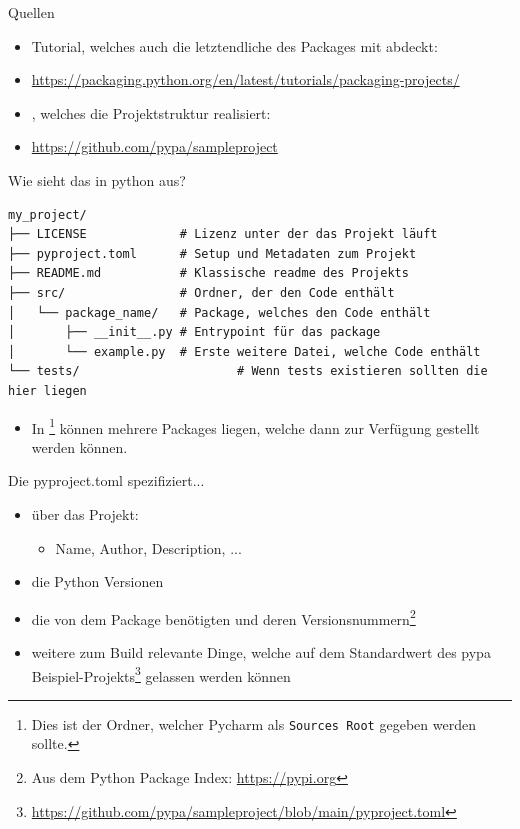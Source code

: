 \documentclass[12pt, aspectratio=169, usepdftitle=false]{beamer}
\newcommand{\furl}[1]{\footnote{\url{#1}}}
\begin{document}
\begin{frame}{Quellen}
	\begin{itemize}
		\item Tutorial, welches auch die letztendliche  des Packages mit abdeckt:
		\item[] \url{https://packaging.python.org/en/latest/tutorials/packaging-projects/}
		\item {}, welches die Projektstruktur realisiert:
		\item[] \url{https://github.com/pypa/sampleproject}
	\end{itemize}

\end{frame}


\begin{frame}[fragile]{Wie sieht das in python aus?}
\begin{verbatim}
my_project/
├── LICENSE             # Lizenz unter der das Projekt läuft
├── pyproject.toml      # Setup und Metadaten zum Projekt
├── README.md           # Klassische readme des Projekts
├── src/                # Ordner, der den Code enthält
│   └── package_name/   # Package, welches den Code enthält
│       ├── __init__.py # Entrypoint für das package
│       └── example.py  # Erste weitere Datei, welche Code enthält
└── tests/						# Wenn tests existieren sollten die hier liegen 
\end{verbatim}
	\begin{itemize}
		\item In \footnote{Dies ist der Ordner, welcher Pycharm als \texttt{Sources Root} gegeben werden sollte.} können mehrere Packages liegen, welche dann zur Verfügung gestellt werden können.
	\end{itemize}

\end{frame}

\begin{frame}{Die pyproject.toml spezifiziert...}
	\begin{itemize}
		\item {} über das Projekt:
		\begin{itemize}
			\item Name, Author, Description, ...
		\end{itemize}
		\item die  Python Versionen
		\item die von dem Package benötigten  und deren Versionsnummern\footnote{Aus dem Python Package Index: \url{https://pypi.org}}
		\item weitere zum Build relevante Dinge, welche auf dem Standardwert des pypa Beispiel-Projekts\furl{https://github.com/pypa/sampleproject/blob/main/pyproject.toml} gelassen werden können
	\end{itemize}
	
	
\end{frame}
\end{document}
